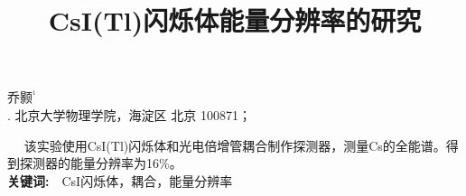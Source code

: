 \documentclass[a4paper,10.0pt,twoside]{npr}
\begin{document}
\setcounter{page}{001}%
\begin{center}
\title{%
\xiaoerhao \bf  %
CsI(Tl)闪烁体能量分辨率的研究\\[-5mm]}
\maketitle
\large \fs
乔颢$^{^1}$\\[2mm]

\xiaowu {}. 北京大学物理学院，海淀区 北京 100871；\\[4mm]

 

\parbox{158mm} {
~~\fs
该实验使用CsI(Tl)闪烁体和光电倍增管耦合制作探测器，测量Cs的全能谱。得到探测器的能量分辨率为16\%。
\\
{\bf 关键词:}~~\fs CsI闪烁体，耦合，能量分辨率}\\
\end{center}
\vspace{5mm}
\setcounter{section}{0}
\end{document}

